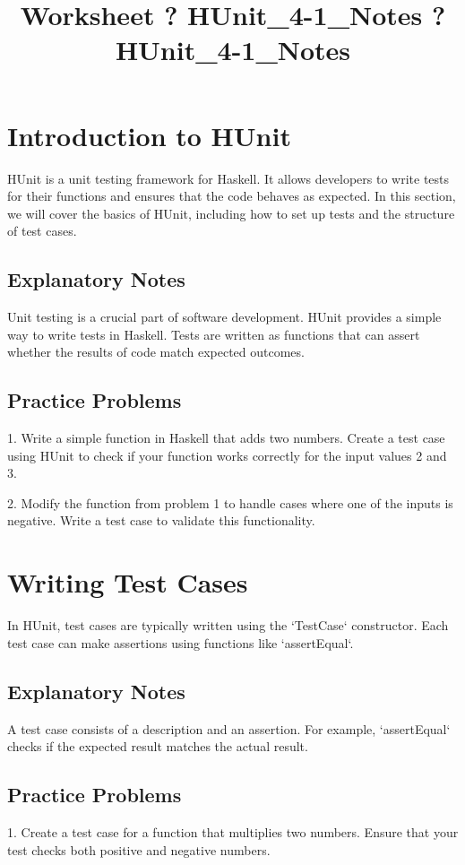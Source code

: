 \documentclass{article}
\title{Worksheet ? HUnit_4-1_Notes ? HUnit_4-1_Notes}
\author{}
\date{}
\begin{document}
\maketitle

\section*{Introduction to HUnit}
HUnit is a unit testing framework for Haskell. It allows developers to write tests for their functions and ensures that the code behaves as expected. In this section, we will cover the basics of HUnit, including how to set up tests and the structure of test cases.

\subsection*{Explanatory Notes}
Unit testing is a crucial part of software development. HUnit provides a simple way to write tests in Haskell. Tests are written as functions that can assert whether the results of code match expected outcomes.

\subsection*{Practice Problems}
1. Write a simple function in Haskell that adds two numbers. Create a test case using HUnit to check if your function works correctly for the input values 2 and 3.

2. Modify the function from problem 1 to handle cases where one of the inputs is negative. Write a test case to validate this functionality.

\section*{Writing Test Cases}
In HUnit, test cases are typically written using the `TestCase` constructor. Each test case can make assertions using functions like `assertEqual`.

\subsection*{Explanatory Notes}
A test case consists of a description and an assertion. For example, `assertEqual` checks if the expected result matches the actual result.

\subsection*{Practice Problems}
1. Create a test case for a function that multiplies two numbers. Ensure that your test checks both positive and negative numbers.
\end{document}

